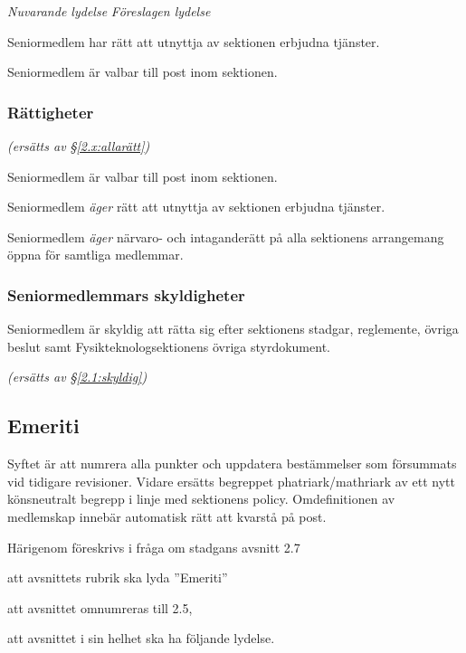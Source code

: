 \documentclass{article}
\newenvironment{lydelse}
    {\begin{paracol}{2}%
        \emph{Nuvarande lydelse}%
        \switchcolumn%
        \emph{Föreslagen lydelse}%
    \end{paracol}%
    \begin{enumerate}[label=\thesubsection.\arabic*]%
    \begin{paracol}{2}%
    }{\end{paracol}\end{enumerate}}
\newcommand{\itemb}{\item[\textbullet]}
\begin{document}
\begin{lydelse}
    \itemb Seniormedlem har rätt att utnyttja av sektionen erbjudna tjänster.
   
    \itemb Seniormedlem är valbar till post inom sektionen.
    
\switchcolumn
    \subsubsection*{Rättigheter}%
    \emph{(ersätts av \S \ref{2.x:allarätt})}
    
    \item Seniormedlem är valbar till post inom sektionen.
    
    \item Seniormedlem \emph{äger} rätt att utnyttja av sektionen erbjudna tjänster.
   
    \item Seniormedlem \emph{äger} närvaro- och intaganderätt på alla sektionens arrangemang öppna för samtliga medlemmar.

  \switchcolumn*
    \subsubsection*{Seniormedlemmars skyldigheter}%
    \itemb Seniormedlem är skyldig att rätta sig efter sektionens stadgar, regle\-mente, övriga beslut samt  Fysikteknologsektionens övriga styrdokument.
    
  \switchcolumn
    \emph{(ersätts av \S \ref{2.1:skyldig})}
\end{lydelse}

\subsection{Emeriti}
Syftet är att numrera alla punkter och uppdatera bestämmelser som försummats vid tidigare revisioner.
Vidare ersätts begreppet phatriark/mathriark av ett nytt könsneutralt begrepp i linje med sektionens policy.
Omdefinitionen av medlemskap innebär automatisk rätt att kvarstå på post.

Härigenom föreskrivs i fråga om stadgans avsnitt 2.7
\begin{dels}
    \item att avsnittets rubrik ska lyda ''Emeriti''
    \item att avsnittet omnumreras till 2.5,
    \item att avsnittet i sin helhet ska ha följande lydelse.
\end{dels}
\end{document}
